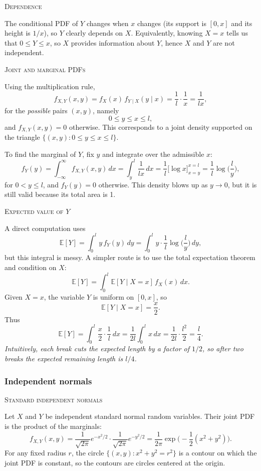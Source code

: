 \textsc{Dependence}

The conditional PDF of \(Y\) changes when \(x\) changes (its support is \([0,x]\) and its height is \(1/x\)), so \(Y\) clearly depends on \(X\).  
Equivalently, knowing \(X=x\) tells us that \(0 \le Y \le x\), so \(X\) provides information about \(Y\), hence \(X\) and \(Y\) are not independent.

\textsc{Joint and marginal PDFs}

Using the multiplication rule,
\[
f_{X,Y}(x,y)
=
f_X(x)\,f_{Y\mid X}(y\mid x)
=
\frac{1}{l}\cdot\frac{1}{x}
=
\frac{1}{lx},
\]
for the \textit{possible} pairs \((x,y)\), namely
\[
0 \le y \le x \le l,
\]
and \(f_{X,Y}(x,y)=0\) otherwise.  
This corresponds to a joint density supported on the triangle \(\{(x,y)\colon 0\le y\le x\le l\}\).

To find the marginal of \(Y\), fix \(y\) and integrate over the admissible \(x\):
\[
f_Y(y)
=
\int_{-\infty}^{\infty} f_{X,Y}(x,y)\,dx
=
\int_{y}^{l} \frac{1}{lx}\,dx
=
\frac{1}{l}\big[\log x\big]_{x=y}^{x=l}
=
\frac{1}{l}\log\!\Big(\frac{l}{y}\Big),
\]
for \(0<y\le l\), and \(f_Y(y)=0\) otherwise.  
This density blows up as \(y\to 0\), but it is still valid because its total area is 1.

\textsc{Expected value of \(Y\)}

A direct computation uses
\[
\mathbb{E}[Y]
=
\int_{0}^{l} y\,f_Y(y)\,dy
=
\int_{0}^{l} y\cdot\frac{1}{l}\log\!\Big(\frac{l}{y}\Big)\,dy,
\]
but this integral is messy.  
A simpler route is to use the total expectation theorem and condition on \(X\):
\[
\mathbb{E}[Y]
=
\int_{0}^{l} \mathbb{E}[Y\mid X=x]\,f_X(x)\,dx.
\]
Given \(X=x\), the variable \(Y\) is uniform on \([0,x]\), so
\[
\mathbb{E}[Y\mid X=x] = \frac{x}{2}.
\]
Thus
\[
\mathbb{E}[Y]
=
\int_{0}^{l} \frac{x}{2}\cdot\frac{1}{l}\,dx
=
\frac{1}{2l}\int_{0}^{l} x\,dx
=
\frac{1}{2l}\cdot\frac{l^{2}}{2}
=
\frac{l}{4}.
\]
\textit{Intuitively, each break cuts the expected length by a factor of \(1/2\), so after two breaks the expected remaining length is \(l/4\).}


\subsubsection{Independent normals}

\textsc{Standard independent normals}

Let \(X\) and \(Y\) be independent standard normal random variables.  
Their joint PDF is the product of the marginals:
\[
f_{X,Y}(x,y)
=
\frac{1}{\sqrt{2\pi}}e^{-x^{2}/2}
\cdot
\frac{1}{\sqrt{2\pi}}e^{-y^{2}/2}
=
\frac{1}{2\pi}\exp\!\Big(-\frac{1}{2}(x^{2}+y^{2})\Big).
\]
For any fixed radius \(r\), the circle \(\{(x,y)\colon x^{2}+y^{2}=r^{2}\}\) is a contour on which the joint PDF is constant, so the contours are circles centered at the origin.

